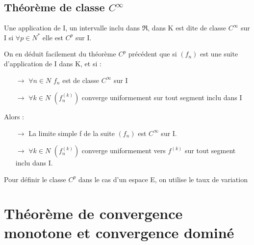 \subsection{Théorème de classe $C^{\infty}$}
\begin{de}
Une application de I, un intervalle inclu dans $\Re$, dans K est dite de classe $C^{\infty}$ sur I si $\forall p \in N^*$ elle est $C^p$ sur I.
\end{de}
On en déduit facilement du théorème $C^p$ précédent que si $(f_n)$ est une suite d'application de I dans K, et si : \\
\begin{itemize}
 \item[$\rightarrow$] $\forall n \in N$ $f_n$ est de classe $C^{\infty}$ sur I\\
 \item[$\rightarrow$] $\forall k \in N$ $(f_n^{(k)})$ converge uniformement sur tout segment inclu dans I\\
\end{itemize}
Alors :\\
\begin{itemize}
 \item[$\rightarrow$] La limite simple f de la suite $(f_n)$ est $C^{\infty}$ sur I.
 \item[$\rightarrow$] $\forall k \in N$ $(f_n^{(k)})$ converge uniformement vers $f^{(k)}$ sur tout segment inclu dans I.
\end{itemize}
Pour définir le classe $C^p$ dans le cas d'un espace E, on utilise le taux de variation
\section{Théorème de convergence monotone et convergence dominé}
